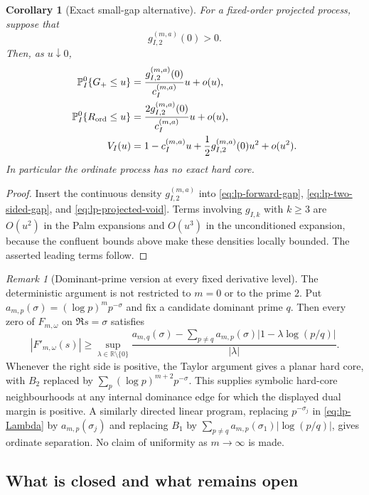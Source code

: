 \documentclass[11pt]{article}
\newtheorem{corollary}[theorem]{Corollary}
\theoremstyle{definition}
\theoremstyle{remark}
\newtheorem{remark}[theorem]{Remark}
\newcommand{\R}{\mathbb R}
\begin{document}
\begin{corollary}[Exact small-gap alternative]
\label{cor:lp-no-core}
For a fixed-order projected process, suppose that
\[
 g_{I,2}^{(m,a)}(0)>0.
\]
Then, as $u\downarrow0$,
\begin{align}
 {\mathbb P}_I^0\{G_+\leq u\}
 &=\frac{g_{I,2}^{(m,a)}(0)}{c_I^{(m,a)}}u+o(u),
 \label{eq:lp-small-forward}\\
 {\mathbb P}_I^0\{R_{\rm ord}\leq u\}
 &=\frac{2g_{I,2}^{(m,a)}(0)}{c_I^{(m,a)}}u+o(u),
 \label{eq:lp-small-nearest}\\
 V_I(u)
 &=1-c_I^{(m,a)}u+\frac12g_{I,2}^{(m,a)}(0)u^2+o(u^2).
 \label{eq:lp-small-void}
\end{align}
In particular the ordinate process has no exact hard core.
\end{corollary}

\begin{proof}
Insert the continuous density $g_{I,2}^{(m,a)}$ into
\eqref{eq:lp-forward-gap}, \eqref{eq:lp-two-sided-gap}, and
\eqref{eq:lp-projected-void}.  Terms involving $g_{I,k}$ with $k\geq3$ are
$O(u^2)$ in the Palm expansions and $O(u^3)$ in the unconditioned expansion,
because the confluent bounds above make these densities locally bounded.
The asserted leading terms follow.
\end{proof}

\begin{remark}[Dominant-prime version at every fixed derivative level]
\label{rem:lp-dominant-prime}
The deterministic argument is not restricted to $m=0$ or to the prime $2$.
Put $a_{m,p}(\sigma)=(\log p)^mp^{-\sigma}$ and fix a candidate dominant
prime $q$.  Then every zero of $F_{m,\omega}$ on $\Re s=\sigma$ satisfies
\[
 |F'_{m,\omega}(s)|\geq
 \sup_{\lambda\in\R\setminus\{0\}}
 \frac{a_{m,q}(\sigma)-
 \sum_{p\neq q}a_{m,p}(\sigma)
 |1-\lambda\log(p/q)|}{|\lambda|}.
\]
Whenever the right side is positive, the Taylor argument gives a planar hard
core, with $B_2$ replaced by
$\sum_p(\log p)^{m+2}p^{-\sigma}$.  This supplies symbolic hard-core
neighbourhoods at any internal dominance edge for which the displayed dual
margin is positive.  A similarly directed linear program, replacing
$p^{-\sigma_j}$ in \eqref{eq:lp-Lambda} by $a_{m,p}(\sigma_j)$ and replacing
$B_1$ by $\sum_{p\neq q}a_{m,p}(\sigma_1)|\log(p/q)|$, gives ordinate
separation.  No claim of uniformity as $m\to\infty$ is made.
\end{remark}

\subsection{What is closed and what remains open}
\end{document}
